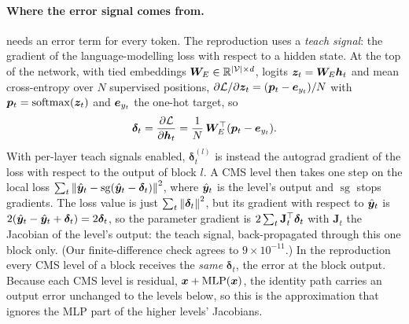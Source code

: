 \paragraph{Where the error signal comes from.}  needs an error term for
every token. The reproduction uses a \emph{teach signal}: the gradient of the language-modelling
loss with respect to a hidden state. At the top of the network, with tied embeddings
$\bm{W}_E \in \mathbb{R}^{\left\lvert \mathcal{V}\right\rvert\times d}$, logits $\bm{z}_t = \bm{W}_E\bm{h}_t$ and mean cross-entropy over
$N$ supervised positions, $\partial\mathcal{L}/\partial\bm{z}_t = (\bm{p}_t - \bm{e}_{y_t})/N$ with
$\bm{p}_t = \operatorname{softmax}(\bm{z}_t)$ and $\bm{e}_{y_t}$ the one-hot target, so
\begin{equation}
  \bm{\delta}_t = \frac{\partial\mathcal{L}}{\partial\bm{h}_t} = \frac{1}{N}\,\bm{W}_E^{\top}(\bm{p}_t - \bm{e}_{y_t}).
  \label{eq:c11-teach}
\end{equation}
With per-layer teach signals enabled, $\bm{\delta}^{(l)}_t$ is instead the autograd gradient of
the loss with respect to the output of block $l$. A CMS level then takes one step on the local
loss $\sum_t\left\lVert \hat{\bm{y}}_t - \operatorname{sg}(\hat{\bm{y}}_t - \bm{\delta}_t)\right\rVert^2$, where
$\hat{\bm{y}}_t$ is the level's output and $\operatorname{sg}$ stops gradients. The loss value is just
$\sum_t\left\lVert \bm{\delta}_t\right\rVert^2$, but its gradient with respect to $\hat{\bm{y}}_t$ is
$2(\hat{\bm{y}}_t - \hat{\bm{y}}_t + \bm{\delta}_t) = 2\bm{\delta}_t$, so the parameter gradient is
$2\sum_t\mathbf{J}_t^{\top}\bm{\delta}_t$ with $\mathbf{J}_t$ the Jacobian of the level's output: the
teach signal, back-propagated through this one block only. (Our finite-difference check agrees
to $9\times10^{-11}$.) In the reproduction every CMS level of a block receives the \emph{same}
$\bm{\delta}_t$, the error at the block output. Because each CMS level is residual,
$\bm{x} + \mathrm{MLP}(\bm{x})$, the identity path carries an output error unchanged to the levels below,
so this is the approximation that ignores the MLP part of the higher levels' Jacobians.


